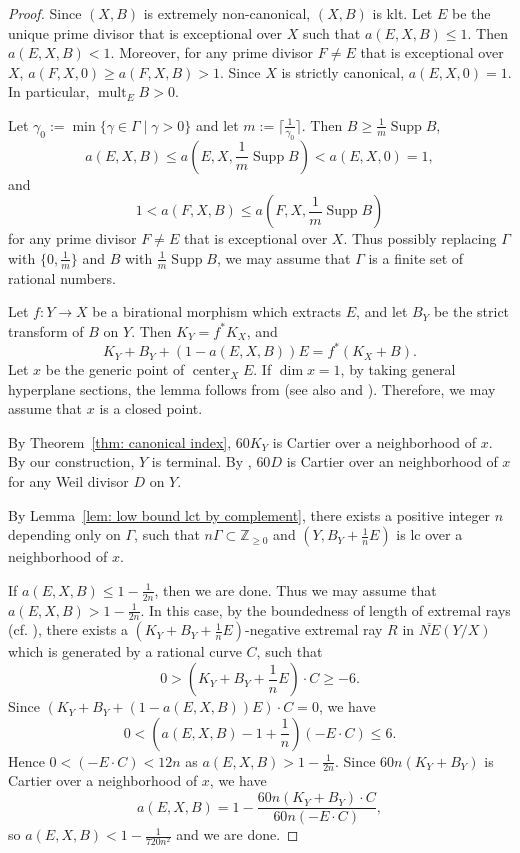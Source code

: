 \documentclass[11pt]{amsart}
\numberwithin{equation}{section}
\newcommand{\Zz}{\mathbb{Z}}
\newcommand{\Center}{\operatorname{center}}
\newcommand{\Supp}{\operatorname{Supp}}
\newcommand{\mult}{\operatorname{mult}}
\newcommand{\Ii}{{\Gamma}}
\theoremstyle{definition}
\theoremstyle{definition}
\begin{document}
\begin{proof}
Since $(X,B)$ is extremely non-canonical, $(X,B)$ is klt. Let $E$ be the unique prime divisor that is exceptional over $X$ such that $a(E,X,B)\leq 1$. Then $a(E,X,B)<1$. Moreover, for any prime divisor $F\not=E$ that is exceptional over $X$, $a(F,X,0)\geq a(F,X,B)>1$. Since $X$ is strictly canonical, $a(E,X,0)=1$. In particular, $\mult_E B>0$.

Let $\gamma_0:=\min\{\gamma\in\Ii\mid \gamma>0\}$ and let $m:=\lceil\frac{1}{\gamma_0}\rceil$. Then $B\geq\frac{1}{m}\Supp B$, 
$$a(E,X,B)\leq a(E,X,\frac{1}{m}\Supp B)<a(E,X,0)=1,$$
and
$$1<a(F,X,B)\leq a(F,X,\frac{1}{m}\Supp B)$$
for any prime divisor $F\not=E$ that is exceptional over $X$. Thus possibly replacing $\Ii$ with $\{0,\frac{1}{m}\}$ and $B$ with $\frac{1}{m}\Supp B$, we may assume that $\Ii$ is a finite set of rational numbers.

Let $f: Y\rightarrow X$ be a birational morphism which extracts $E$, and let $B_Y$ be the strict transform of $B$ on $Y$. Then $K_Y=f^{*}K_X$, and $$K_Y+B_Y+(1-a(E,X,B))E=f^*(K_X+B).$$ Let $x$ be the generic point of $\Center_XE$. If $\dim x=1$, by taking general hyperplane sections, the lemma follows from  \cite[Theorem~3.8]{Ale93} (see also \cite{Sho94b} and \cite[Theorem~1.5]{HL20}). Therefore, we may assume that $x$ is a closed point. 

By Theorem~\ref{thm: canonical index}, $60K_Y$ is Cartier over a neighborhood of $x$. By our construction, $Y$ is terminal. By \cite[Lemma~5.1]{Kaw88}, $60D$ is Cartier over an neighborhood of $x$ for any Weil divisor $D$ on $Y$.

By Lemma~\ref{lem: low bound lct by complement}, there exists a positive integer $n$ depending only on $\Ii$, such that $n\Ii\subset\Zz_{\geq 0}$ and $(Y,B_Y+\frac{1}{n}E)$ is lc over a neighborhood of $x$. 

If $a(E,X,B)\leq 1-\frac{1}{2n}$, then we are done. Thus we may assume that $a(E,X,B)>1-\frac{1}{2n}$. In this case, by the boundedness of length of extremal rays (cf. \cite[Theorem~4.5.2(5)]{Fuj17}), there exists a $(K_Y+B_Y+\frac{1}{n}E)$-negative extremal ray $R$ in $\overline{NE}(Y/X)$ which is generated by a rational curve $C$, such that 
$$0>(K_Y+B_Y+\frac{1}{n}E)\cdot C\geq -6.$$
Since $(K_Y+B_Y+(1-a(E,X,B))E)\cdot C=0$, we have
$$0< (a(E,X,B)-1+\frac{1}{n})(-E\cdot C)\leq 6.$$
Hence $0<(-E\cdot C)<12n$ as $a(E,X,B)>1-\frac{1}{2n}$. Since  $60n(K_Y+B_Y)$ is Cartier over a neighborhood of $x$, we have
$$a(E,X,B)=1-\frac{60n(K_Y+B_Y)\cdot C}{60n(-E\cdot C)},$$
so $a(E,X,B)<1-\frac{1}{720n^2}$ and we are done.
\end{proof}
\end{document}
